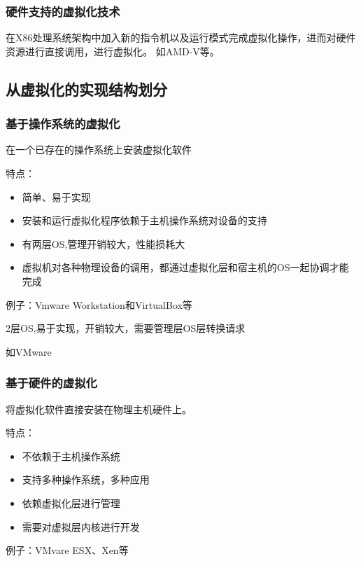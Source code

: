 \subsubsection{硬件支持的虚拟化技术}

\begin{definition}[硬件支持的虚拟化技术]
    在X86处理系统架构中加入新的指令机以及运行模式完成虚拟化操作，进而对硬件资源进行直接调用，进行虚拟化。 如AMD-V等。 
\end{definition}

\subsection{从虚拟化的实现结构划分}

\subsubsection{基于操作系统的虚拟化}
\begin{definition}[基于操作系统的虚拟化]
    在一个已存在的操作系统上安装虚拟化软件

    特点：
    
    \begin{itemize}
        \item 简单、易于实现
        \item 安装和运行虚拟化程序依赖于主机操作系统对设备的支持
        \item 有两层OS,管理开销较大，性能损耗大
        \item 虚拟机对各种物理设备的调用，都通过虚拟化层和宿主机的OS一起协调才能完成
    \end{itemize}

    例子：Vmware Workstation和VirtualBox等
\end{definition}

2层OS,易于实现，开销较大，需要管理层OS层转换请求 

如VMware

\subsubsection{基于硬件的虚拟化}

\begin{definition}[基于硬件的虚拟化]
    将虚拟化软件直接安装在物理主机硬件上。 

    特点：
    \begin{itemize}
        \item 不依赖于主机操作系统
        \item 支持多种操作系统，多种应用
        \item 依赖虚拟化层进行管理
        \item 需要对虚拟层内核进行开发
    \end{itemize}

例子：VMvare ESX、Xen等
\end{definition}

